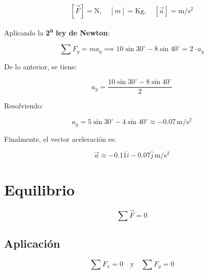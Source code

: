 \[
[\vec{F}] = \mathrm{N}, \quad [m] = \mathrm{Kg}, \quad [\vec{a}] = \mathrm{m/s^2}
\]

Aplicando la \textbf{2\textsuperscript{a} ley de Newton}:

\[
\sum F_y = ma_y \implies 10 \sin 30^\circ - 8 \sin 40^\circ = 2 \cdot a_y
\]

De lo anterior, se tiene:

\[
a_y = \frac{10 \sin 30^\circ - 8 \sin 40^\circ}{2}
\]

Resolviendo:

\[
a_y = 5 \sin 30^\circ - 4 \sin 40^\circ \approx -0.07 \, \mathrm{m/s^2}
\]

Finalmente, el vector aceleración es:

\[
\vec{a} \approx -0.11\hat{i} - 0.07\hat{j} \, \mathrm{m/s^2}
\]
\section{Equilibrio}
\[
\sum \vec{F} = 0
\]
\subsection*{Aplicación}

\[
\sum F_x = 0 \quad \text{y} \quad \sum F_y = 0
\]

\begin{center}
\end{center}
